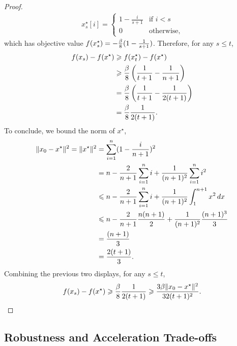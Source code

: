 \begin{proof}
\begin{align}
    x_s^\star[i] = 
    \begin{cases}
        1- \frac{i}{s + 1} &\text{if } i < s \\
        0 &\text{otherwise},
    \end{cases}
\end{align}
which has objective value $f(x_s^\star) = -\frac{\beta}{8}(1 - \frac{1}{s + 1} )$.
Therefore, for any $s \leq t$,
\begin{align}
    f(x_s) - f(x^\star) 
    &\geqslant f(x_t^\star) - f(x^\star) \\
    &\geqslant \frac{\beta}{8} \left(\frac{1}{t+1} - \frac{1}{n+1} \right ) \\
    &= \frac{\beta}{8} \left(\frac{1}{t+1} - \frac{1}{2(t+1)} \right ) \\
    &= \frac{\beta}{8}\frac{1}{2(t+1)}.
\end{align}
To conclude, we bound the norm of $x^\star$,
\begin{align}
    \lVert x_0 - x^\star\rVert^2 =
    \lVert x^\star\rVert^2 
    &= \sum_{i=1}^n (1 - \frac{i}{n+1} )^2  \\
    &= n - \frac{2}{n+1} \sum_{i=1}^n i + \frac{1}{(n+1)^2} \sum_{i=1}^{n} i^2 \\
    &\leqslant n - \frac{2}{n+1} \sum_{i=1}^n i + \frac{1}{(n+1)^2} \int_1^{n+1} x^2 \, dx \\
    &\leqslant n - \frac{2}{n+1}\frac{n(n+1)}{2} + \frac{1}{(n+1)^2} \frac{(n+1)^3}{3} \\
    &= \frac{(n+1)}{3} \\
    &= \frac{2(t+1)}{3}.
\end{align}
Combining the previous two displays, for any $s \leq t$,
\begin{align}
    f(x_s) - f(x^\star)
    \geqslant \frac{\beta}{8}\frac{1}{2(t+1)} 
    \geqslant \frac{3 \beta\lVert x_0 - x^\star\rVert^2}{32(t+1)^2}.
\end{align}
\end{proof}


\subsection{Robustness and Acceleration Trade-offs}



